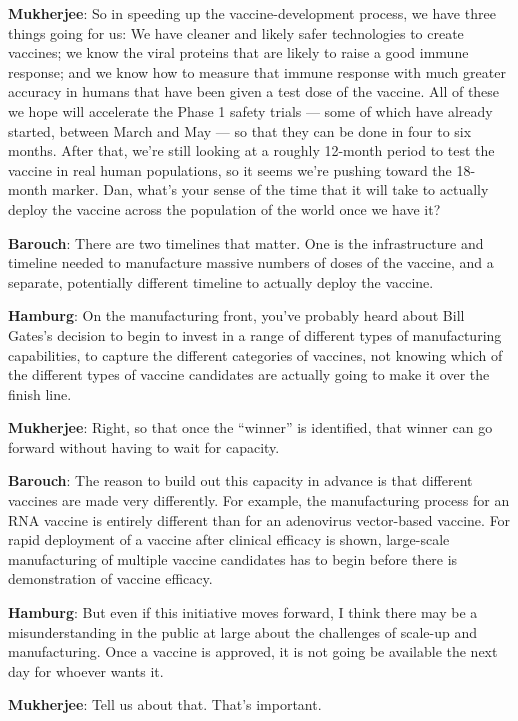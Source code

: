 \textbf{Mukherjee}: So in speeding up the vaccine-development process,
we have three things going for us: We have cleaner and likely safer
technologies to create vaccines; we know the viral proteins that are
likely to raise a good immune response; and we know how to measure that
immune response with much greater accuracy in humans that have been
given a test dose of the vaccine. All of these we hope will accelerate
the Phase 1 safety trials --- some of which have already started,
between March and May --- so that they can be done in four to six
months. After that, we're still looking at a roughly 12-month period to
test the vaccine in real human populations, so it seems we're pushing
toward the 18-month marker. Dan, what's your sense of the time that it
will take to actually deploy the vaccine across the population of the
world once we have it?

\textbf{Barouch}: There are two timelines that matter. One is the
infrastructure and timeline needed to manufacture massive numbers of
doses of the vaccine, and a separate, potentially different timeline to
actually deploy the vaccine.

\textbf{Hamburg}: On the manufacturing front, you've probably heard
about Bill Gates's decision to begin to invest in a range of different
types of manufacturing capabilities, to capture the different categories
of vaccines, not knowing which of the different types of vaccine
candidates are actually going to make it over the finish line.

\textbf{Mukherjee}: Right, so that once the ``winner'' is identified,
that winner can go forward without having to wait for capacity.

\textbf{Barouch}: The reason to build out this capacity in advance is
that different vaccines are made very differently. For example, the
manufacturing process for an RNA vaccine is entirely different than for
an adenovirus vector-based vaccine. For rapid deployment of a vaccine
after clinical efficacy is shown, large-scale manufacturing of multiple
vaccine candidates has to begin before there is demonstration of vaccine
efficacy.

\textbf{Hamburg}: But even if this initiative moves forward, I think
there may be a misunderstanding in the public at large about the
challenges of scale-up and manufacturing. Once a vaccine is approved, it
is not going be available the next day for whoever wants it.

\textbf{Mukherjee}: Tell us about that. That's important.

